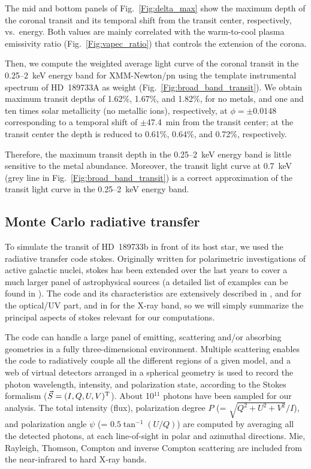 \documentclass[iop]{emulateapj}
\begin{document}
The mid and bottom panels of Fig.~\ref{Fig:delta_max} show the maximum depth of the coronal transit and its 
temporal shift from the transit center, respectively, vs.\ energy. Both values are mainly correlated with the
warm-to-cool plasma emissivity ratio (Fig.~\ref{Fig:vapec_ratio}) that controls the extension of the corona.

Then, we compute the weighted average light curve of the coronal transit in the 0.25--2~keV energy band for 
XMM-Newton/pn using the template instrumental spectrum of HD~189733A as weight (Fig.~\ref{Fig:broad_band_transit}). 
We obtain maximum transit depths of 1.62\%, 1.67\%, and 1.82\%, for no metals, and one and ten times solar 
metallicity (no metallic ions), respectively, at $\phi=\pm0.0148$ corresponding to a temporal shift of 
$\pm$47.4~min from the transit center; at the transit center the depth is reduced to 0.61\%, 0.64\%, and 0.72\%, 
respectively.

Therefore, the maximum transit depth in the 0.25--2~keV energy band is little sensitive to the metal 
abundance. Moreover, the transit light curve at 0.7~keV (grey line in Fig.~\ref{Fig:broad_band_transit}) is a 
correct approximation of the transit light curve in the 0.25--2~keV energy band.



\subsection{Monte Carlo radiative transfer}
\label{Model:Code}

To simulate the transit of HD~189733b in front of its host star, we used the radiative transfer code {\sc stokes}. Originally written for 
polarimetric investigations of active galactic nuclei, {\sc stokes} has been extended over the last years to cover a much larger panel of 
astrophysical sources (a detailed list of examples can be found in \citealt{Marin2014}). The code and its characteristics are extensively 
described in \citet{Goosmann2007}, \citet{Marin2012} and \citet{Marin2015b} for the optical/UV part, and in \citet{Marin2015} for the X-ray band, 
so we will simply summarize the principal aspects of {\sc stokes} relevant for our computations.

The code can handle a large panel of emitting, scattering and/or absorbing geometries in a fully three-dimensional environment. Multiple scattering
enables the code to radiatively couple all the different regions of a given model, and a web of virtual detectors arranged in a spherical geometry is used
to record the photon wavelength, intensity, and polarization state, according to the Stokes formalism ($\vec S = (I, Q, U, V)^{\rm T}$).
About 10$^{ 11}$ photons have been sampled for our analysis. The total intensity (flux), polarization degree $P$ (= $\sqrt{Q^2+U^2+V^2}/I$), 
and polarization angle $\psi$ (= $0.5\tan^{-1}(U/Q)$) are computed by averaging all the detected photons, at each line-of-sight in polar and azimuthal 
directions. Mie, Rayleigh, Thomson, Compton and inverse Compton scattering are included from the near-infrared to hard X-ray bands. 
\end{document}
